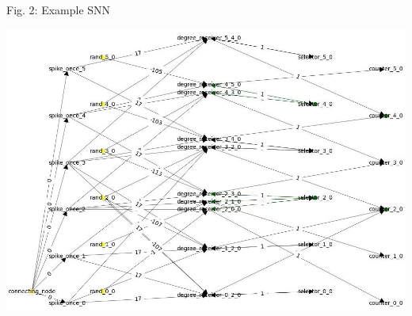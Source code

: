 \begin{rudifig}{\hsize}{Fig. 2: Example SNN}
    
    \hspace{-1em}
    \includegraphics[width=\linewidth]{latex/Images/cropped.jpeg}
    \label{fig:encoded_snn}
\end{rudifig}


